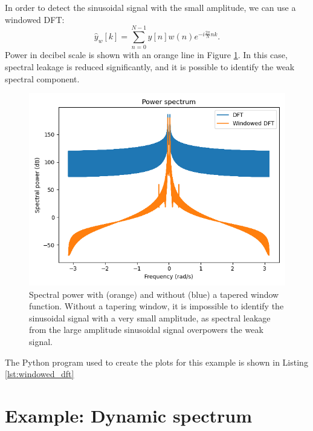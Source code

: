 In order to detect the sinusoidal signal with the small amplitude, we can use a windowed DFT:
\begin{equation}
\hat{y}_w[k] = \sum_{n=0}^{N-1} y[n]w(n)e^{-i\frac{2\pi}{N}nk}.
\end{equation}
Power in decibel scale is shown with an orange line in Figure \ref{fig:windowed_nonwindowed_spec}. In this
case, spectral leakage is reduced significantly, and it is possible to
identify the weak spectral component. 

\begin{figure}
\begin{center}
\includegraphics[width=\textwidth]{code/022_window_functions/windowed_spec.png}
\end{center}
\caption{Spectral power with (orange) and without (blue) a tapered window function. Without a tapering window, 
it is impossible to identify the sinusoidal signal with a very small amplitude, as spectral leakage from 
the large amplitude sinusoidal signal overpowers the weak signal.}
\label{fig:windowed_nonwindowed_spec}
\end{figure}

The Python program used to create the plots for this example is shown in Listing \ref{lst:windowed_dft}





\section{Example: Dynamic spectrum}

